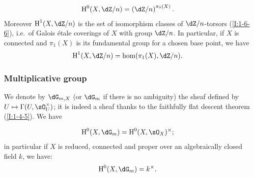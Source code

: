 \[
  \h^0(X,\dZ/n)=\left(\dZ/n\right)^{\pi_0(X)}\text{.}
\]
Moreover $\h^1(X,\dZ/n)$ is the set of isomorphism classes of 
$\dZ/n$-torsors (\ref{I:1-6-6}), i.e.\ of Galois \'etale coverings 
of $X$ with group $\dZ/n$. In particular, if $X$ is connected and 
$\pi_1(X)$ is its fundamental group for a chosen base point, we have 
\[
  \h^1(X,\dZ/n) = \hom(\pi_1(X),\dZ/n)\text{.}
\]





\subsubsection{Multiplicative group}\label{I:2-2-2}

We denote by $\dG_{m,X}$ (or $\dG_m$ if there is no ambiguity) the sheaf 
defined by $U\mapsto \Gamma(U,\sO_U^\times)$; it is indeed a sheaf 
thanks to the faithfully flat descent theorem (\ref{I:1-4-5}). We have 
 
\[
  \h^0(X,\dG_m) = \h^0(X,\sO_X)^\times\text{;}
\]
in particular if $X$ is reduced, connected and proper over an 
algebraically closed field $k$, we have:
\[
  \h^0(X,\dG_m) = k^\times\text{.}
\]


